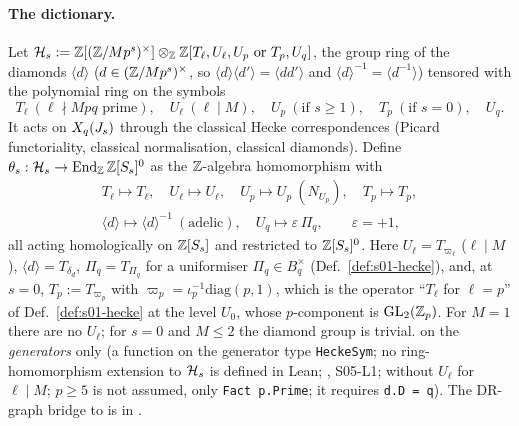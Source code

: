 \paragraph{The dictionary.}
\begin{definition}\label{def:s05-theta}
Let $\mathcal{H}_s:=\mathbb{Z}[(\mathbb{Z}/Mp^s)^\times]\otimes_{\mathbb{Z}}\mathbb{Z}[T_\ell,U_\ell,U_p\text{ or }T_p,U_q]$, the group ring of the diamonds $\langle d\rangle$
($d\in(\mathbb{Z}/Mp^s)^\times$, so $\langle d\rangle\langle d'\rangle=\langle dd'\rangle$ and $\langle d\rangle^{-1}=\langle d^{-1}\rangle$) tensored with the polynomial ring on the symbols
\[T_\ell\ (\ell\nmid Mpq\text{ prime}),\quad U_\ell\ (\ell\mid M),\quad U_p\ (\text{if }s\ge1),\quad T_p\ (\text{if }s=0),\quad U_q.\]
It acts on $X_q(J_s)$ through the classical Hecke correspondences (Picard functoriality, classical normalisation, classical
diamonds). Define $\theta_s:\mathcal{H}_s\to\operatorname{End}_{\mathbb{Z}}\mathbb{Z}[S_s]^0$ as the $\mathbb{Z}$-algebra homomorphism with
\[\begin{gathered}T_\ell\mapsto T_\ell,\quad U_\ell\mapsto U_\ell,\quad U_p\mapsto U_p\ (N_{U_p}),\quad T_p\mapsto T_p,\\
\langle d\rangle\mapsto\langle d\rangle^{-1}\ (\text{adelic}),\quad U_q\mapsto\varepsilon\,\Pi_q,\qquad \varepsilon=+1,\end{gathered}\]
all acting homologically on $\mathbb{Z}[S_s]$ and restricted to $\mathbb{Z}[S_s]^0$. Here $U_\ell=T_{\varpi_\ell}$ ($\ell\mid M$), $\langle d\rangle=T_{\delta_d}$,
$\Pi_q=T_{\Pi_q}$ for a uniformiser $\Pi_q\in B_q^\times$ (Def.~\ref{def:s01-hecke}), and, at $s=0$, $T_p:=T_{\varpi_p}$ with
$\varpi_p=\iota_p^{-1}\mathrm{diag}(p,1)$, which is the operator ``$T_\ell$ for $\ell=p$'' of Def.~\ref{def:s01-hecke} at the level
$U_0$, whose $p$-component is $\mathrm{GL}_2(\mathbb{Z}_p)$. For $M=1$ there are no $U_\ell$; for $s=0$ and $M\le2$ the diamond group is trivial.
 \stformal{} on the \emph{generators} only (a function on the generator type \texttt{HeckeSym}; no ring-homomorphism extension to $\mathcal{H}_s$ is defined in Lean; , S05-L1; without $U_\ell$ for $\ell\mid M$; $p\ge5$ is not assumed, only \texttt{Fact p.Prime}; it requires \texttt{d.D = q}). The DR-graph bridge to  is \stformal{} in .
\end{definition}

